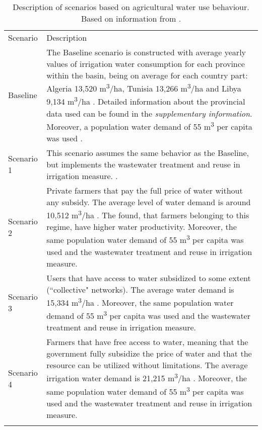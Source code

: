 \begin{table*}[!ht]
    \caption{\label{tbl:scenarios}Description of scenarios based on agricultural water use behaviour. Based on information from \cite{Socioeconomicaspectsirrigation2014}.}
	\footnotesize{
	\begin{tabular*}{\textwidth}{@{}l P{5.3in}}
		\br
		Scenario & Description\\
		\mr
		Baseline & The Baseline scenario is constructed with average yearly values of irrigation water consumption for each province within the basin, being on average for each country part: Algeria 13,520 m\textsuperscript{3}/ha, Tunisia 13,266 m\textsuperscript{3}/ha and Libya 9,134 m\textsuperscript{3}/ha \cite{Socioeconomicaspectsirrigation2014}. Detailed information about the provincial data used can be found in the \textit{supplementary information}. Moreover, a population water demand of 55 m\textsuperscript{3} per capita was used \cite{Householdwaterconsumption2014}.\\
		Scenario 1 & This scenario assumes the same behavior as the Baseline, but implements the wastewater treatment and reuse in irrigation measure. \cite{Householdwaterconsumption2014}.\\
		Scenario 2 & Private farmers that pay the full price of water without any subsidy. The average level of water demand is around 10,512 m\textsuperscript{3}/ha \cite{Socioeconomicaspectsirrigation2014}. The \citet{Socioeconomicaspectsirrigation2014} found, that farmers belonging to this regime, have higher water productivity. Moreover, the same population water demand of 55 m\textsuperscript{3} per capita was used and the wastewater treatment and reuse in irrigation measure.\\ 
		Scenario 3 & Users that have access to water subsidized to some extent (``collective" networks). The average water demand is 15,334 m\textsuperscript{3}/ha \cite{Socioeconomicaspectsirrigation2014}. Moreover, the same population water demand of 55 m\textsuperscript{3} per capita was used and the wastewater treatment and reuse in irrigation measure.\\
		Scenario 4 & Farmers that have free access to water, meaning that the government fully subsidize the price of water and that the resource can be utilized without limitations. The average irrigation water demand is 21,215 m\textsuperscript{3}/ha \cite{Socioeconomicaspectsirrigation2014}. Moreover, the same population water demand of 55 m\textsuperscript{3} per capita was used and the wastewater treatment and reuse in irrigation measure.\\
		\br
	\end{tabular*}
	}
\end{table*}

